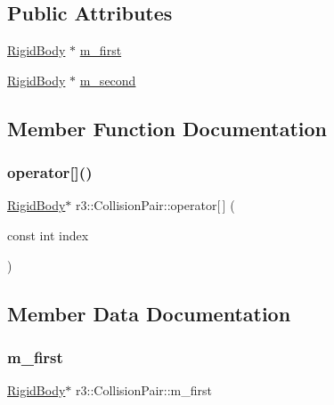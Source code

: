 \subsection*{Public Attributes}
\begin{DoxyCompactItemize}
\item 
\mbox{\hyperlink{classr3_1_1_rigid_body}{Rigid\+Body}} $\ast$ \mbox{\hyperlink{structr3_1_1_collision_pair_a6c2fbf8e05b333a4e93f6ac75049d429}{m\+\_\+first}}
\item 
\mbox{\hyperlink{classr3_1_1_rigid_body}{Rigid\+Body}} $\ast$ \mbox{\hyperlink{structr3_1_1_collision_pair_ad7ff97123502a1e0535d3f5da8013411}{m\+\_\+second}}
\end{DoxyCompactItemize}


\subsection{Member Function Documentation}
\mbox{\label{structr3_1_1_collision_pair_ae6b965e4d3525253b9b1e3270e8665e8}} 
\subsubsection{\texorpdfstring{operator[]()}{operator[]()}}
{\footnotesize\ttfamily \mbox{\hyperlink{classr3_1_1_rigid_body}{Rigid\+Body}}$\ast$ r3\+::\+Collision\+Pair\+::operator\mbox{[}$\,$\mbox{]} (\begin{DoxyParamCaption}\item[{const int}]{index }\end{DoxyParamCaption})\hspace{0.3cm}{\ttfamily [inline]}}



\subsection{Member Data Documentation}
\mbox{\label{structr3_1_1_collision_pair_a6c2fbf8e05b333a4e93f6ac75049d429}} 
\subsubsection{\texorpdfstring{m\+\_\+first}{m\_first}}
{\footnotesize\ttfamily \mbox{\hyperlink{classr3_1_1_rigid_body}{Rigid\+Body}}$\ast$ r3\+::\+Collision\+Pair\+::m\+\_\+first}

